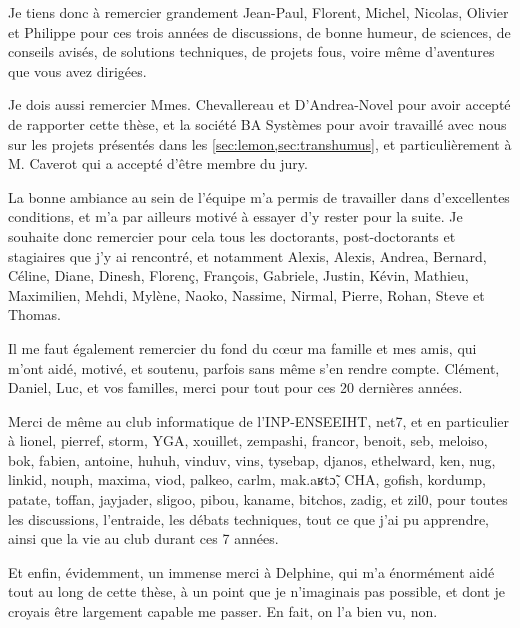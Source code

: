 Je tiens donc à remercier grandement Jean-Paul, Florent, Michel, Nicolas, Olivier et Philippe pour ces trois années
de discussions, de bonne humeur, de sciences, de conseils avisés, de solutions techniques, de projets fous, voire même
d'aventures que vous avez dirigées.

Je dois aussi remercier Mmes. Chevallereau et D'Andrea-Novel pour avoir accepté de rapporter cette thèse, et la société
BA Systèmes pour avoir travaillé avec nous sur les projets présentés dans les \cref{sec:lemon,sec:transhumus}, et
particulièrement à M. Caverot qui a accepté d'être membre du jury.

La bonne ambiance au sein de l'équipe m'a permis de travailler dans d'excellentes conditions, et m'a par ailleurs
motivé à essayer d'y rester pour la suite. Je souhaite donc remercier pour cela tous les doctorants, post-doctorants
et stagiaires que j'y ai rencontré, et notamment Alexis, Alexis, Andrea, Bernard, Céline, Diane, Dinesh, Florenç,
François, Gabriele, Justin, Kévin, Mathieu, Maximilien, Mehdi, Mylène, Naoko, Nassime, Nirmal, Pierre, Rohan, Steve et
Thomas.

Il me faut également remercier du fond du cœur ma famille et mes amis, qui m'ont aidé, motivé, et soutenu, parfois sans
même s'en rendre compte. Clément, Daniel, Luc, et vos familles, merci pour tout pour ces 20 dernières années.

Merci de même au club informatique de l'INP-ENSEEIHT, net7, et en particulier à lionel, pierref, storm, YGA, xouillet,
zempashi, francor, benoit, seb, meloiso, bok, fabien, antoine, huhuh, vinduv, vins, tysebap, djanos, ethelward, ken,
nug, linkid, nouph, maxima, viod, palkeo, carlm, mak.aʁtɔ̃, CHA, gofish, kordump, patate, toffan, jayjader, sligoo,
pibou, kaname, bitchos, zadig, et zil0, pour toutes les discussions, l'entraide, les débats techniques, tout ce que
j'ai pu apprendre, ainsi que la vie au club durant ces 7 années.

Et enfin, évidemment, un immense merci à Delphine, qui m'a énormément aidé tout au long de cette thèse, à un point que
je n'imaginais pas possible, et dont je croyais être largement capable me passer. En fait, on l'a bien vu, non.
